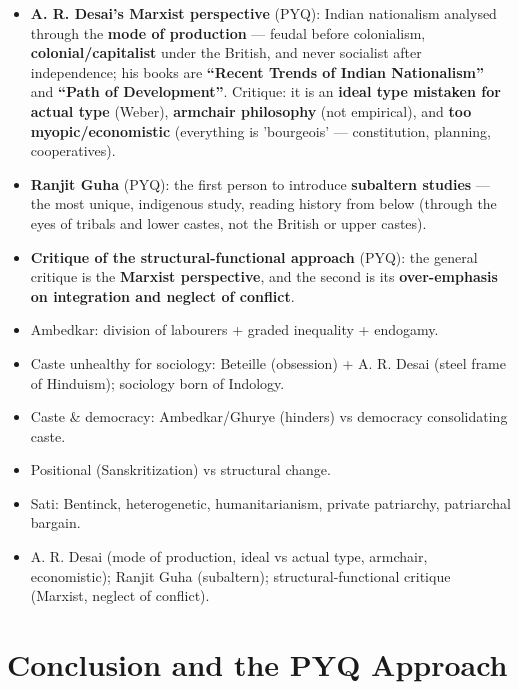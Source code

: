\begin{KeyConcept}
\begin{itemize}
\item \textbf{A. R. Desai's Marxist perspective} (PYQ): Indian nationalism analysed through the \textbf{mode of production} --- feudal before colonialism, \textbf{colonial/capitalist} under the British, and never socialist after independence; his books are \textbf{``Recent Trends of Indian Nationalism''} and \textbf{``Path of Development''}. Critique: it is an \textbf{ideal type mistaken for actual type} (Weber), \textbf{armchair philosophy} (not empirical), and \textbf{too myopic/economistic} (everything is 'bourgeois' --- constitution, planning, cooperatives).
\item \textbf{Ranjit Guha} (PYQ): the first person to introduce \textbf{subaltern studies} --- the most unique, indigenous study, reading history from below (through the eyes of tribals and lower castes, not the British or upper castes).
\item \textbf{Critique of the structural-functional approach} (PYQ): the general critique is the \textbf{Marxist perspective}, and the second is its \textbf{over-emphasis on integration and neglect of conflict}.
\end{itemize}
\end{KeyConcept}

\begin{QuickRevision}
\begin{itemize}
\item Ambedkar: division of labourers + graded inequality + endogamy.
\item Caste unhealthy for sociology: Beteille (obsession) + A. R. Desai (steel frame of Hinduism); sociology born of Indology.
\item Caste \& democracy: Ambedkar/Ghurye (hinders) vs democracy consolidating caste.
\item Positional (Sanskritization) vs structural change.
\item Sati: Bentinck, heterogenetic, humanitarianism, private patriarchy, patriarchal bargain.
\item A. R. Desai (mode of production, ideal vs actual type, armchair, economistic); Ranjit Guha (subaltern); structural-functional critique (Marxist, neglect of conflict).
\end{itemize}
\end{QuickRevision}

\section{Conclusion and the PYQ Approach}

